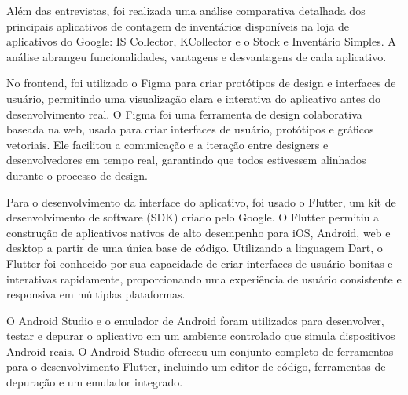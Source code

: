 Além das entrevistas, foi realizada uma análise comparativa detalhada dos principais aplicativos de contagem de inventários disponíveis na loja de aplicativos do Google: IS Collector, KCollector e o Stock e Inventário Simples. A análise abrangeu funcionalidades, vantagens e desvantagens de cada aplicativo.

No frontend, foi utilizado o Figma para criar protótipos de design e interfaces de usuário, permitindo uma visualização clara e interativa do aplicativo antes do desenvolvimento real. O Figma foi uma ferramenta de design colaborativa baseada na web, usada para criar interfaces de usuário, protótipos e gráficos vetoriais. Ele facilitou a comunicação e a iteração entre designers e desenvolvedores em tempo real, garantindo que todos estivessem alinhados durante o processo de design.

Para o desenvolvimento da interface do aplicativo, foi usado o Flutter, um kit de desenvolvimento de software (SDK) criado pelo Google. O Flutter permitiu a construção de aplicativos nativos de alto desempenho para iOS, Android, web e desktop a partir de uma única base de código. Utilizando a linguagem Dart, o Flutter foi conhecido por sua capacidade de criar interfaces de usuário bonitas e interativas rapidamente, proporcionando uma experiência de usuário consistente e responsiva em múltiplas plataformas.

O Android Studio e o emulador de Android foram utilizados para desenvolver, testar e depurar o aplicativo em um ambiente controlado que simula dispositivos Android reais. O Android Studio ofereceu um conjunto completo de ferramentas para o desenvolvimento Flutter, incluindo um editor de código, ferramentas de depuração e um emulador integrado.

